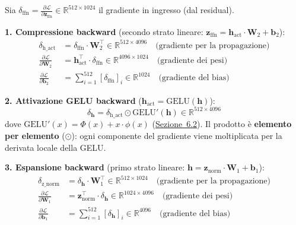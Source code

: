 \documentclass[12pt,a4paper]{article}
\begin{document}
\begin{formulabox}
Sia $\delta_{\text{ffn}} = \frac{\partial \mathcal{L}}{\partial \mathbf{z}_{\text{ffn}}} \in \mathbb{R}^{512 \times 1024}$ il gradiente in ingresso (dal residual).

\textbf{1. Compressione backward} (secondo strato lineare: $\mathbf{z}_{\text{ffn}} = \mathbf{h}_{\text{act}} \cdot \mathbf{W}_2 + \mathbf{b}_2$):
\begin{align*}
    \delta_{\text{h\_act}} &= \delta_{\text{ffn}} \cdot \mathbf{W}_2^\top \in \mathbb{R}^{512 \times 4096} \quad \text{(gradiente per la propagazione)} \\
    \frac{\partial \mathcal{L}}{\partial \mathbf{W}_2} &= \mathbf{h}_{\text{act}}^\top \cdot \delta_{\text{ffn}} \in \mathbb{R}^{4096 \times 1024} \quad \text{(gradiente dei pesi)} \\
    \frac{\partial \mathcal{L}}{\partial \mathbf{b}_2} &= \sum_{i=1}^{512} [\delta_{\text{ffn}}]_i \in \mathbb{R}^{1024} \quad \text{(gradiente del bias)}
\end{align*}

\textbf{2. Attivazione GELU backward} ($\mathbf{h}_{\text{act}} = \text{GELU}(\mathbf{h})$):
\[
    \delta_{\mathbf{h}} = \delta_{\text{h\_act}} \odot \text{GELU}'(\mathbf{h}) \in \mathbb{R}^{512 \times 4096}
\]
dove $\text{GELU}'(x) = \Phi(x) + x \cdot \phi(x)$ (\hyperref[sec:gelu]{Sezione~6.2}). Il prodotto \`e \textbf{elemento per elemento} ($\odot$): ogni componente del gradiente viene moltiplicata per la derivata locale della GELU.

\textbf{3. Espansione backward} (primo strato lineare: $\mathbf{h} = \mathbf{z}_{\text{norm}} \cdot \mathbf{W}_1 + \mathbf{b}_1$):
\begin{align*}
    \delta_{\text{z\_norm}} &= \delta_{\mathbf{h}} \cdot \mathbf{W}_1^\top \in \mathbb{R}^{512 \times 1024} \quad \text{(gradiente per la propagazione)} \\
    \frac{\partial \mathcal{L}}{\partial \mathbf{W}_1} &= \mathbf{z}_{\text{norm}}^\top \cdot \delta_{\mathbf{h}} \in \mathbb{R}^{1024 \times 4096} \quad \text{(gradiente dei pesi)} \\
    \frac{\partial \mathcal{L}}{\partial \mathbf{b}_1} &= \sum_{i=1}^{512} [\delta_{\mathbf{h}}]_i \in \mathbb{R}^{4096} \quad \text{(gradiente del bias)}
\end{align*}
\end{formulabox}
\end{document}
